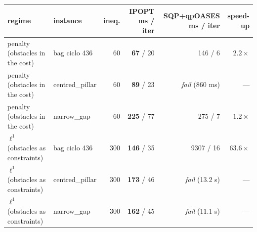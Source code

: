 \begin{tabular}{llrrrr}
  \toprule
  regime & instance & ineq. & IPOPT ms / iter & SQP+qpOASES ms / iter & speed-up \\
  \midrule
  penalty (obstacles in the cost) & bag ciclo 436 & 60 & \textbf{67} / 20 & 146 / 6 & $2.2\times$ \\
  penalty (obstacles in the cost) & centred\_pillar & 60 & \textbf{89} / 23 & \emph{fail} (860 ms) & --- \\
  penalty (obstacles in the cost) & narrow\_gap & 60 & \textbf{225} / 77 & 275 / 7 & $1.2\times$ \\
  $\ell^1$ (obstacles as constraints) & bag ciclo 436 & 300 & \textbf{146} / 35 & 9307 / 16 & $63.6\times$ \\
  $\ell^1$ (obstacles as constraints) & centred\_pillar & 300 & \textbf{173} / 46 & \emph{fail} (13.2 s) & --- \\
  $\ell^1$ (obstacles as constraints) & narrow\_gap & 300 & \textbf{162} / 45 & \emph{fail} (11.1 s) & --- \\
  \bottomrule
\end{tabular}
